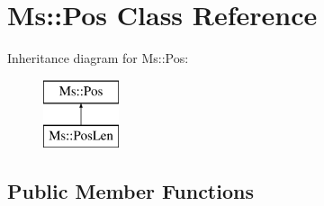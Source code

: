 \hypertarget{class_ms_1_1_pos}{}\section{Ms\+:\+:Pos Class Reference}
\label{class_ms_1_1_pos}
Inheritance diagram for Ms\+:\+:Pos\+:\begin{figure}[H]
\begin{center}
\leavevmode
\includegraphics[height=2.000000cm]{class_ms_1_1_pos}
\end{center}
\end{figure}
\subsection*{Public Member Functions}
